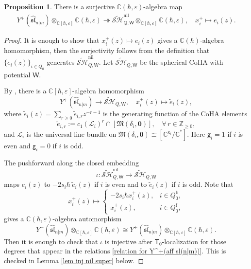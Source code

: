 \documentclass[10pt]{amsart}
\theoremstyle{definition}
\newtheorem{Proposition}[Theorem]{Proposition}
\numberwithin{equation}{section}
\newcommand{\bC}{\mathbb{C}}
\newcommand{\bZ}{\mathbb{Z}}
\newcommand{\fM}{\mathfrak{M}}
\newcommand{\sT}{\mathsf{T}}
\newcommand{\sW}{\mathsf{W}}
\begin{document}
\begin{Proposition}\label{prop Y^+(aff sl(n|m)) to COHA}
There is a surjective $\bC(\hbar,\varepsilon)$-algebra map
\begin{align*}
    Y^+(\widehat{\mathfrak{sl}}_{n|m})\otimes_{\bC[\hbar,\varepsilon]}\bC(\hbar,\varepsilon)\twoheadrightarrow \widetilde{\mathcal{SH}}^{\mathrm{nil}}_{Q,\sW}\otimes_{\bC[\hbar,\varepsilon]}\bC(\hbar,\varepsilon),\quad x^+_{i}\mapsto e_{i}(z).
\end{align*}
\end{Proposition}

\begin{proof}
It is enough to show that $x^+_i(z)\mapsto e_i(z)$ gives a $\bC(\hbar)$-algebra homomorphism, then the surjectivity follows from the definition that $\{e_i(z)\}_{i\in Q_0}$ generates $\widetilde{\mathcal{SH}}^{\mathrm{nil}}_{Q,\sW}$. Let $\widetilde{\mathcal{SH}}_{Q,\sW}$ be the spherical CoHA with potential $\sW$. 

By \cite[Thm.~C.2]{VV1}, there is a $\bC[\hbar,\varepsilon]$-algebra homomorphism  
$$Y^+(\widehat{\mathfrak{sl}}_{n|m})\to \widetilde{\mathcal{SH}}_{Q,\sW}, \quad x^+_i(z)\mapsto \tilde{e}_i(z), $$ 
where $\tilde{e}_i(z)=\sum_{r\geqslant 0}\tilde{e}_{i,r}z^{-r-1}$ is the generating function of the CoHA elements
$$\tilde{e}_{i,r}:=c_1(\mathcal L_{i})^{r}\cap\left[\fM(\delta_i,\mathbf 0)\right], \quad \forall \, r\in \bZ_{\geqslant 0},$$
and $\mathcal L_{i}$ is the universal line bundle on $\fM(\delta_i,\mathbf 0)\cong [\bC^{\mathsf g_i}/\bC^*]$. Here $\mathsf g_i=1$ if $i$ is even and $\mathsf g_i=0$ if $i$ is odd. 

The pushforward along the closed embedding 
$$\iota\colon \widetilde{\mathcal{SH}}^{\mathrm{nil}}_{Q,\sW}\to \widetilde{\mathcal{SH}}_{Q,\sW}$$ maps $e_i(z)$ to $-2s_i\hbar\: \tilde{e}_i(z)$ if $i$ is even and to $\tilde{e}_i(z)$ if $i$ is odd. 
Note that $$x^+_i(z)\mapsto \begin{cases}
-2s_i\hbar x^+_i(z),& i\in Q_0^{\mathrm{b}},\\ 
x^+_i(z),& i\in Q_0^{\mathrm{f}},
\end{cases}$$
gives a $\bC(\hbar,\varepsilon)$-algebra automorphism 
$$Y^+(\widehat{\mathfrak{sl}}_{n|m})\otimes_{\bC[\hbar,\varepsilon]}\bC(\hbar,\varepsilon)\cong Y^+(\widehat{\mathfrak{sl}}_{n|m})\otimes_{\bC[\hbar,\varepsilon]}\bC(\hbar,\varepsilon).$$ 
Then it is enough to check that $\iota$ is injective after $\sT_0$-localization for those degrees that appear in the relations \eqref{relation for Y^+(aff sl(n|m))}. This is checked in Lemma \ref{lem inj nil super} below.
\end{proof}
\end{document}
